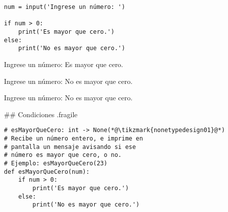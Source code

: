 \bgncolumns
{}
\vspace{-1ex}


\begin{lstlisting}
num = input('Ingrese un número: ')

if num > 0:
    print('Es mayor que cero.')
else:
    print('No es mayor que cero.')
\end{lstlisting}


\vspace{-1ex}


\begin{exampleConsole}
Ingrese un número: 
Es mayor que cero.
\end{exampleConsole}

\fullrule


\begin{exampleConsole}
Ingrese un número: 
No es mayor que cero.
\end{exampleConsole}

\fullrule


\begin{exampleConsole}
Ingrese un número: 
No es mayor que cero.
\end{exampleConsole}

\trmcolumns

## Condiciones {.fragile}

\begin{lstlisting}
# esMayorQueCero: int -> None(*@\tikzmark{nonetypedesign01}@*)
# Recibe un número entero, e imprime en
# pantalla un mensaje avisando si ese
# número es mayor que cero, o no.
# Ejemplo: esMayorQueCero(23)
def esMayorQueCero(num):
    if num > 0:
        print('Es mayor que cero.')
    else:
        print('No es mayor que cero.')
\end{lstlisting}

\vspace{-3ex}

